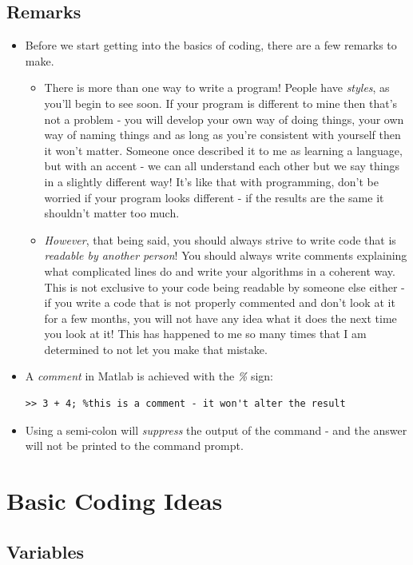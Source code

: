 \documentclass[12pt]{report}
\begin{document}
\subsection*{Remarks}

\begin{itemize}
\item Before we start getting into the basics of coding, there are a few remarks to make.
\begin{itemize}
\item There is more than one way to write a program! People have \textit{styles}, as you'll begin to see soon. If your program is different to mine then that's not a problem - you will develop your own way of doing things, your own way of naming things and as long as you're consistent with yourself then it won't matter. Someone once described it to me as learning a language, but with an accent - we can all understand each other but we say things in a slightly different way! It's like that with programming, don't be worried if your program looks different - if the results are the same it shouldn't matter too much.
\item \textit{However}, that being said, you should always strive to write code that is \textit{readable by another person}! You should always write comments explaining what complicated lines do and write your algorithms in a coherent way. This is not exclusive to your code being readable by someone else either - if you write a code that is not properly commented and don't look at it for a few months, you will not have any idea what it does the next time you look at it! This has happened to me so many times that I am determined to not let you make that mistake.
\end{itemize}
\item A \textit{comment} in Matlab is achieved with the \textit{\%} sign:
\begin{lstlisting}
>> 3 + 4; %this is a comment - it won't alter the result
\end{lstlisting} 
\item Using a semi-colon will \textit{suppress} the output of the command - and the answer will not be printed to the command prompt.
\end{itemize}

\section*{Basic Coding Ideas}

\subsection*{Variables}
\end{document}
